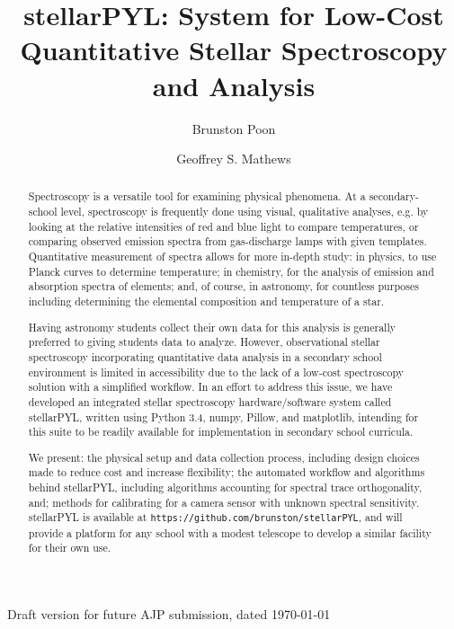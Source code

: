 \documentclass[prb,preprint]{revtex4-1}
\begin{document}
	\title{stellarPYL: System for Low-Cost Quantitative Stellar Spectroscopy and Analysis}
	\author{Brunston Poon}
	\author{Geoffrey S. Mathews}

	Draft version for future AJP submission, dated \today

\begin{abstract}
	Spectroscopy is a versatile tool for examining physical phenomena. At a secondary-school level, spectroscopy is frequently done using visual, qualitative analyses, e.g. by looking at the relative intensities of red and blue light to compare temperatures, or comparing observed emission spectra from gas-discharge lamps with given templates. Quantitative measurement of spectra allows for more in-depth study: in physics, to use Planck curves to determine temperature; in chemistry, for the analysis of emission and absorption spectra of elements; and, of course, in astronomy, for countless purposes including determining the elemental composition and temperature of a star.

	Having astronomy students collect their own data for this analysis is generally preferred to giving students data to analyze. However, observational stellar spectroscopy incorporating quantitative data analysis in a secondary school environment is limited in accessibility due to the lack of a low-cost spectroscopy solution with a simplified workflow. In an effort to address this issue, we have developed an integrated stellar spectroscopy hardware/software system called stellarPYL, written using Python 3.4, numpy, Pillow, and matplotlib, intending for this suite to be readily available for implementation in secondary school curricula.

	We present: the physical setup and data collection process, including design choices made to reduce cost and increase flexibility; the automated workflow and algorithms behind stellarPYL, including algorithms accounting for spectral trace orthogonality, and; methods for calibrating for a camera sensor with unknown spectral sensitivity. stellarPYL is available at \verb|https://github.com/brunston/stellarPYL|, and will provide a platform for any school with a modest telescope to develop a similar facility for their own use.
\end{abstract}
\maketitle
\end{document}
